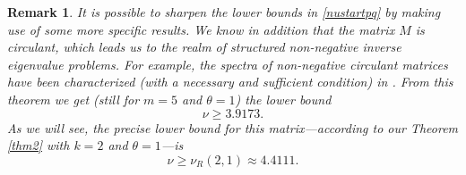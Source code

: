 \documentclass[a4paper]{article}
\newtheorem{remark}{Remark}
\newcommand{\te}{\theta}
\newcommand{\nplus}{\mathbb{N}^+}
\begin{document}
\begin{remark}

It is possible to sharpen the lower bounds in \eqref{nustartpq} by making use of some more specific results. 
We know in addition that the matrix $M$ is \emph{circulant}, which leads us to the realm of 
\emph{structured non-negative inverse eigenvalue problems}. For example, 
the spectra of non-negative circulant matrices have been characterized (with a necessary \emph{and} sufficient condition) in \cite[Theorem 10]{rojosoto}. From this theorem we get (still for $m=5$ and $\te=1$) the lower bound
\[
\nu\ge 3.9173.
\]
As we will see, the precise lower bound for this matrix---according to our Theorem \ref{thm2} with $k=2$ and $\te=1$---is
\[
\nu\ge \nu_R(2,1)\approx 4.4111.
\]
\end{remark}
\end{document}
